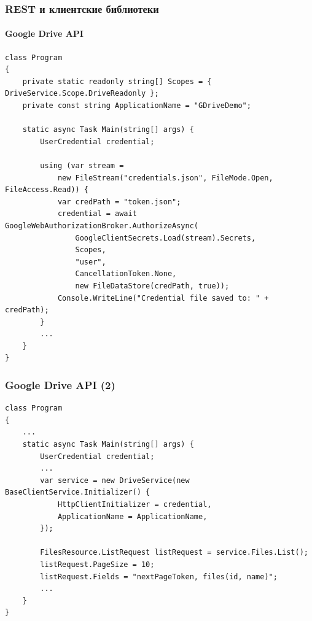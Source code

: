 \documentclass[xetex,mathserif,serif]{beamer}
\begin{document}
    \begin{frame}[fragile]
        \frametitle{REST и клиентские библиотеки}
        \framesubtitle{Google Drive API}
        \begin{scriptsize}
            \begin{verbatim}
class Program
{
    private static readonly string[] Scopes = { DriveService.Scope.DriveReadonly };
    private const string ApplicationName = "GDriveDemo";

    static async Task Main(string[] args) {
        UserCredential credential;

        using (var stream =
            new FileStream("credentials.json", FileMode.Open, FileAccess.Read)) {
            var credPath = "token.json";
            credential = await GoogleWebAuthorizationBroker.AuthorizeAsync(
                GoogleClientSecrets.Load(stream).Secrets,
                Scopes,
                "user",
                CancellationToken.None,
                new FileDataStore(credPath, true));
            Console.WriteLine("Credential file saved to: " + credPath);
        }
        ...
    }
}
            \end{verbatim}
        \end{scriptsize}
    \end{frame}

    \begin{frame}[fragile]
        \frametitle{Google Drive API (2)}
        \begin{scriptsize}
            \begin{verbatim}
class Program
{
    ...
    static async Task Main(string[] args) {
        UserCredential credential;
        ...
        var service = new DriveService(new BaseClientService.Initializer() {
            HttpClientInitializer = credential,
            ApplicationName = ApplicationName,
        });

        FilesResource.ListRequest listRequest = service.Files.List();
        listRequest.PageSize = 10;
        listRequest.Fields = "nextPageToken, files(id, name)";
        ...
    }
}
            \end{verbatim}
        \end{scriptsize}
    \end{frame}
\end{document}
